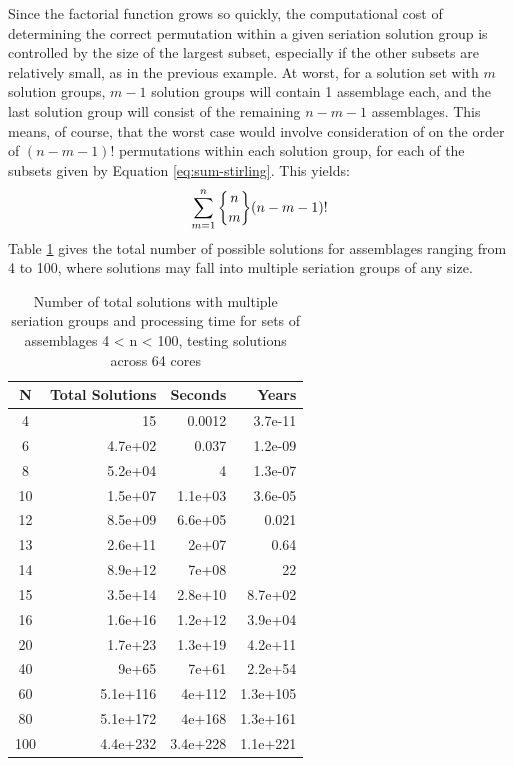 \documentclass[preprint,times,authoryear,12pt]{els-workingpaper}
\newcommand{\stirlingsubset}[2]{\ensuremath{\genfrac{\lbrace}{\rbrace}{0pt}{}{#1}{#2}}}
\begin{document}
Since the factorial function grows so quickly, the computational cost of determining the correct permutation within a given seriation solution group is controlled by the size of the largest subset, especially if the other subsets are relatively small, as in the previous example.  At worst, for a solution set with $m$ solution groups, $m-1$ solution groups will contain 1 assemblage each, and the last solution group will consist of the remaining $n-m-1$ assemblages.  This means, of course, that the worst case would involve consideration of on the order of $(n-m-1)!$ permutations within each solution group, for each of the subsets given by Equation \ref{eq:sum-stirling}.  This yields:
\begin{equation}
\sum_{m=1}^n \stirlingsubset{n}{m} (n-m-1)!
\end{equation}
Table \ref{tab:total-mult} gives the total number of possible solutions for assemblages ranging from 4 to 100, where solutions may fall into multiple seriation groups of any size.  

\begin{table}[ht]
\centering
\begin{tabular}{|c|r|r|r|}
  \hline
N & Total Solutions & Seconds & Years \\ 
  \hline
  4 &  15 & 0.0012 & 3.7e-11 \\ 
    6 & 4.7e+02 & 0.037 & 1.2e-09 \\ 
    8 & 5.2e+04 &   4 & 1.3e-07 \\ 
   10 & 1.5e+07 & 1.1e+03 & 3.6e-05 \\ 
   12 & 8.5e+09 & 6.6e+05 & 0.021 \\ 
   13 & 2.6e+11 & 2e+07 & 0.64 \\ 
   14 & 8.9e+12 & 7e+08 &  22 \\ 
   15 & 3.5e+14 & 2.8e+10 & 8.7e+02 \\ 
   16 & 1.6e+16 & 1.2e+12 & 3.9e+04 \\ 
   20 & 1.7e+23 & 1.3e+19 & 4.2e+11 \\ 
   40 & 9e+65 & 7e+61 & 2.2e+54 \\ 
   60 & 5.1e+116 & 4e+112 & 1.3e+105 \\ 
   80 & 5.1e+172 & 4e+168 & 1.3e+161 \\ 
  100 & 4.4e+232 & 3.4e+228 & 1.1e+221 \\ 
   \hline
\end{tabular}
\caption{Number of total solutions with multiple seriation groups and processing time for sets of assemblages 4 < n < 100, testing solutions across 64 cores} 
\label{tab:total-mult}
\end{table}
\end{document}

